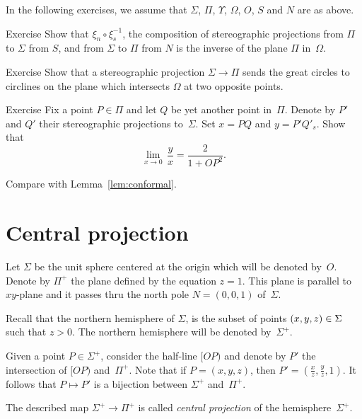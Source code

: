 In the following exercises,
we assume that $\Sigma$, $\Pi$, $\Upsilon$, $\Omega$, $O$, $S$ and $N$ are as above.
  
\begin{thm}{Exercise}\label{ex:two-stereographics}
Show that $\xi_n \circ \xi^{-1}_s$, the composition of stereographic projections 
from $\Pi$ to $\Sigma$ from  $S$, and
from $\Sigma$ to $\Pi$ from  $N$ is 
the inverse of the plane $\Pi$ in~$\Omega$.
\end{thm}

\begin{thm}{Exercise}\label{ex:great-circ}
Show that  a stereographic projection $\Sigma\to\Pi$
sends the great circles to circlines on the plane which intersects $\Omega$ at two opposite points.
\end{thm}

\begin{thm}{Exercise}\label{ex:conform-sphere}
Fix a point $P\in \Pi$  and let $Q$ be yet another point in~$\Pi$.
Denote by $P'$ and $Q'$ their stereographic projections to~$\Sigma$.
Set $x=PQ$ and $y=P'Q'_s$.
Show that
$$\lim_{x\to 0}\, \frac{y}{x}=\frac{2}{1+OP^2}.$$

Compare with Lemma~\ref{lem:conformal}.
\end{thm}



\section*{Central projection}

Let $\Sigma$ be the unit sphere centered at the origin which will be denoted by~$O$.
Denote by $\Pi^+$ the plane defined by the equation $z=1$.
This plane is parallel to $xy$-plane and it passes thru 
the north pole $N=(0,0,1)$ of~$\Sigma$.

Recall that the northern hemisphere of $\Sigma$,
is the subset of points $(x,y,z)\z\in \Sigma$ such that $z>0$.
The northern  hemisphere will be denoted by~$\Sigma^+$.

Given a point $P\in \Sigma^+$, consider the  
half-line $[OP)$ and denote by $P'$ the intersection of $[OP)$ and~$\Pi^+$.
Note that 
if $P=(x,y,z)$, then $P'=(\tfrac xz,\tfrac yz,1)$.
It follows that $P\mapsto P'$ is a bijection between $\Sigma^+$ and~$\Pi^+$.

The described map $\Sigma^+\to \Pi^+$ is called \emph{central projection} of 
the hemisphere~$\Sigma^+$.

